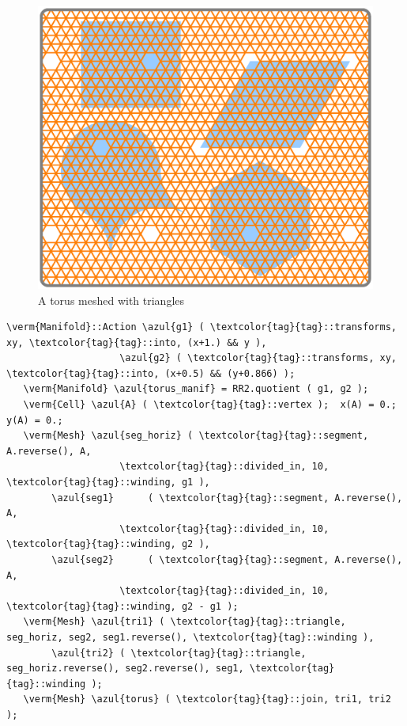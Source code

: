 \begin{figure}[ht] \centering
  \includegraphics[width=120mm]{flat-torus-5.eps}
  \caption{A torus meshed with triangles}
  \label{\numb section 7.\numb fig 6}
\end{figure}

\begin{Verbatim}[commandchars=\\\{\},formatcom=\small\tt,frame=single,
   label=parag-\ref{\numb section 7.\numb parag 9}.cpp,rulecolor=\color{coment},
   baselinestretch=0.94,framesep=2mm                                            ]
   \verm{Manifold}::Action \azul{g1} ( \textcolor{tag}{tag}::transforms, xy, \textcolor{tag}{tag}::into, (x+1.) && y ),
                    \azul{g2} ( \textcolor{tag}{tag}::transforms, xy, \textcolor{tag}{tag}::into, (x+0.5) && (y+0.866) );
   \verm{Manifold} \azul{torus_manif} = RR2.quotient ( g1, g2 );
   \verm{Cell} \azul{A} ( \textcolor{tag}{tag}::vertex );  x(A) = 0.;  y(A) = 0.;
   \verm{Mesh} \azul{seg_horiz} ( \textcolor{tag}{tag}::segment, A.reverse(), A,
                    \textcolor{tag}{tag}::divided_in, 10, \textcolor{tag}{tag}::winding, g1 ),
        \azul{seg1}      ( \textcolor{tag}{tag}::segment, A.reverse(), A,
                    \textcolor{tag}{tag}::divided_in, 10, \textcolor{tag}{tag}::winding, g2 ),
        \azul{seg2}      ( \textcolor{tag}{tag}::segment, A.reverse(), A,
                    \textcolor{tag}{tag}::divided_in, 10, \textcolor{tag}{tag}::winding, g2 - g1 );
   \verm{Mesh} \azul{tri1} ( \textcolor{tag}{tag}::triangle, seg_horiz, seg2, seg1.reverse(), \textcolor{tag}{tag}::winding ),
        \azul{tri2} ( \textcolor{tag}{tag}::triangle, seg_horiz.reverse(), seg2.reverse(), seg1, \textcolor{tag}{tag}::winding );
   \verm{Mesh} \azul{torus} ( \textcolor{tag}{tag}::join, tri1, tri2 );
\end{Verbatim}

